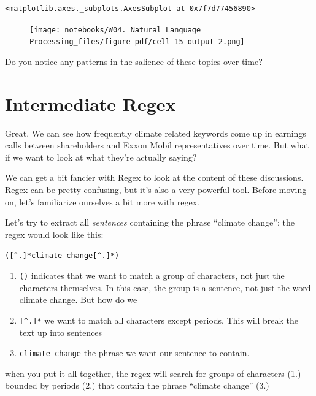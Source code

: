 \documentclass[
  letterpaper,
  DIV=11,
  numbers=noendperiod]{scrreprt}
\providecommand{\tightlist}{%
  \setlength{\itemsep}{0pt}\setlength{\parskip}{0pt}}\usepackage{longtable,booktabs,array}
\begin{document}
\begin{verbatim}
<matplotlib.axes._subplots.AxesSubplot at 0x7f7d77456890>
\end{verbatim}

\begin{figure}[H]

{\centering \texttt{[image: notebooks/W04. Natural Language Processing\_files/figure-pdf/cell-15-output-2.png]}

}

\end{figure}

Do you notice any patterns in the salience of these topics over time?

\hypertarget{intermediate-regex}{%
\section{Intermediate Regex}\label{intermediate-regex}}

Great. We can see how frequently climate related keywords come up in
earnings calls between shareholders and Exxon Mobil representatives over
time. But what if we want to look at what they're actually saying?

We can get a bit fancier with Regex to look at the content of these
discussions. Regex can be pretty confusing, but it's also a very
powerful tool. Before moving on, let's familiarize ourselves a bit more
with regex.

Let's try to extract all \emph{sentences} containing the phrase
``climate change''; the regex would look like this:

\texttt{({[}\^{}.{]}*climate\ change{[}\^{}.{]}*)}

\begin{enumerate}
\def\labelenumi{\arabic{enumi}.}
\tightlist
\item
  \texttt{()} indicates that we want to match a group of characters, not
  just the characters themselves. In this case, the group is a sentence,
  not just the word climate change. But how do we
\item
  \texttt{{[}\^{}.{]}*} we want to match all characters except periods.
  This will break the text up into sentences
\item
  \texttt{climate\ change} the phrase we want our sentence to contain.
\end{enumerate}

when you put it all together, the regex will search for groups of
characters (1.) bounded by periods (2.) that contain the phrase
``climate change'' (3.)
\end{document}
